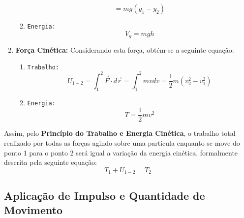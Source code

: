 \documentclass{article}
\begin{document}
\begin{enumerate}[noitemsep]
\begin{enumerate}[noitemsep]
\[{                                                = mg (y_{1} - y_{2})
                                    }
                                \]
                            \item \texttt{Energia:}
                                \begin{equation}
                                    \boxed{
                                        V_{g} = mgh
                                    }
                                \end{equation}
                        \end{enumerate}
                    \item \textbf{Força Cinética:} Considerando esta força, obtém-se a seguinte equação:
                        \begin{enumerate}[noitemsep]
                            \item \texttt{Trabalho:}
                                \[
                                    \boxed{
                                        U_{1-2} = \int_{1}^{2} \vec{F} \cdot d\vec{r}
                                                = \int_{1}^{2} mvdv
                                                = \frac{1}{2} m (v_{2}^{2} - v_{1}^{2})
                                    }
                                \]
                            \item \texttt{Energia:}
                                \begin{equation}
                                    \boxed{
                                        T = \frac{1}{2} m v^{2}
                                    }
                                \end{equation}
                        \end{enumerate}
                \end{enumerate}
            Assim, pelo \textbf{Princípio do Trabalho e Energia Cinética}, o trabalho total realizado por todas as forças agindo sobre uma partícula enquanto se move do ponto 1 para o ponto 2 será igual a variação da energia cinética, formalmente descrita pela seguinte equação:
                \begin{equation}
                    \boxed{
                        T_{1} + U_{1-2} = T_{2}
                    }
                \end{equation}

        \subsection{Aplicação de Impulso e Quantidade de Movimento}
\end{document}

